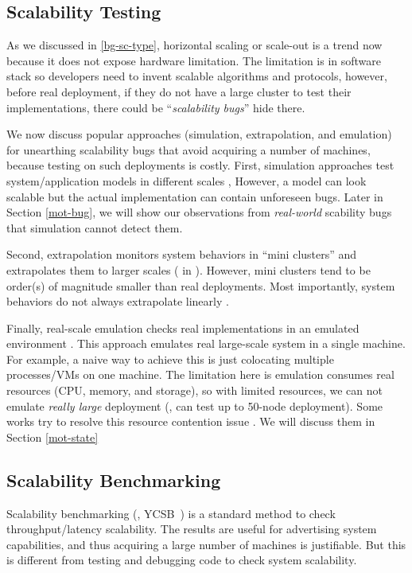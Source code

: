 \subsection{Scalability Testing}

As we discussed in \ref{bg-sc-type}, horizontal scaling or scale-out is a trend
now because it does not expose hardware limitation. The limitation is in
software stack so developers need to invent scalable algorithms and protocols,
however, before real deployment, if they do not have a large cluster to test
their implementations, there could be ``\textit{scalability bugs}'' hide there.

We now discuss popular approaches (simulation, extrapolation, and emulation) for
unearthing scalability bugs that avoid acquiring a number of machines, because
testing on such deployments is costly.
First, simulation approaches test system/application models in different scales
\cite{Calotoiu+13-ApmScaleBug, Laguna+15-DebugAtScale}, However, a model can
look scalable but the actual implementation can contain unforeseen bugs. Later
in Section \ref{mot-bug}, we will show our observations from \textit{real-world}
scability bugs that simulation cannot detect them.

Second, extrapolation monitors system behaviors in ``mini clusters'' and
extrapolates them to larger scales ( in \cite{Wang+14-Exalt}). However,
mini clusters tend to be order(s) of magnitude smaller than real deployments.
Most importantly, system behaviors do not always extrapolate linearly
\cite{Wang+14-Exalt}. 

Finally, real-scale emulation checks real implementations in an emulated
environment \cite{Gupta+08-DieCast, Wang+14-Exalt}. This approach emulates real
large-scale system in a single machine. For example, a naive way to achieve this
is just colocating multiple processes/VMs on one machine. The limitation here is
emulation consumes real resources (CPU, memory, and storage), so with limited
resources, we can not emulate \textit{really large} deployment (\eg, can test up
to 50-node deployment). Some works try to resolve this resource contention issue
\cite{Gupta+08-DieCast, Wang+14-Exalt}. We will discuss them in Section
\ref{mot-state}

\subsection{Scalability Benchmarking}

Scalability benchmarking (\eg, YCSB~\cite{Cooper+10-YCSB}) is a standard method
to check throughput/latency scalability.  The results are useful for
advertising system capabilities, and thus acquiring a large number of machines
is justifiable. But this is different from testing and debugging code to check
system scalability.

